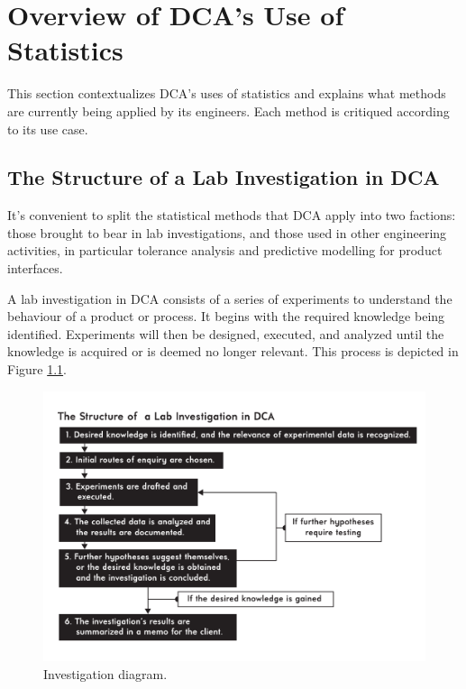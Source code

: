 \documentclass[11pt,a4paper,article]{memoir} %
\begin{document}
\newpage



\chapter {Overview of DCA's Use of Statistics}
This section contextualizes DCA's uses of statistics and explains what methods are currently being applied by its engineers. Each method is critiqued according to its use case.
\section{The Structure of a Lab Investigation in DCA}
It's convenient to split the statistical methods that DCA apply into two factions: those brought to bear in lab investigations, and those used in other engineering activities, in particular tolerance analysis and predictive modelling for product interfaces.
\par
A lab investigation in DCA consists of a series of experiments to understand the behaviour of a product or process. It begins with the required knowledge being identified. Experiments will then be designed, executed, and analyzed until the knowledge is acquired or is deemed no longer relevant. This process is depicted in Figure \ref{fig:investigation_diagram}.
\begin{figure}[h!]
\centering
\includegraphics[width=1.2\textwidth]{Lab_Investigation_Diagram.pdf}
\caption{Investigation diagram.}
\label{fig:investigation_diagram}
\end{figure}
\end{document}
